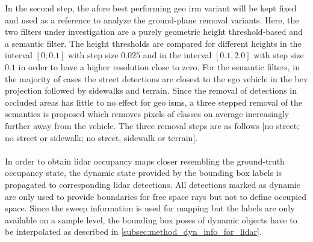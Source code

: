In the second step, the afore best performing geo \gls{irm} variant will be kept fixed and used as a reference to analyze the ground-plane removal variants. Here, the two filters under investigation are a purely geometric height threshold-based and a semantic filter. The height thresholds are compared for different heights in the interval $[0,0.1]$ with step size $0.025$ and in the interval $[0.1,2.0]$ with step size $0.1$ in order to have a higher resolution close to zero. For the semantic filters, in the majority of cases the street detections are closest to the ego vehicle in the \gls{bev} projection followed by sidewalks and terrain. Since the removal of detections in occluded areas has little to no effect for geo \gls{ism}s, a three stepped removal of the semantics is proposed which removes pixels of classes on average increasingly further away from the vehicle. The three removal steps are as follows $[$no street; no street or sidewalk; no street, sidewalk or terrain$]$.
\\\\
In order to obtain lidar occupancy maps closer resembling the ground-truth occupancy state, the dynamic state provided by the bounding box labels is propagated to corresponding lidar detections. All detections marked as dynamic are only used to provide boundaries for free space rays but not to define occupied space. Since the sweep information is used for mapping but the labels are only available on a sample level, the bounding box poses of dynamic objects have to be interpolated as described in \ref{subsec:method_dyn_info_for_lidar}. 
%
